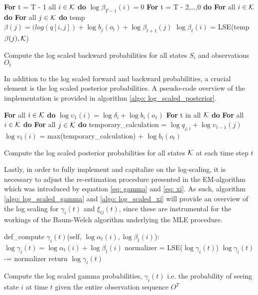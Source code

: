 \begin{algorithm}[H]
\textbf{For} t = T - 1 all $i \in \operatorname{\mathcal{K}}$ \textbf{do} \;
\Indp
$\log\beta_{T-1}(i) = 0$ \;
\BlankLine
\Indm
\textbf{For} t = T - 2,\ldots,0  \textbf{do} \;
\Indp
\textbf{For} all $i \in \operatorname{\mathcal{K}}$ \textbf{do} \;
\Indp 
\textbf{For} all $j \in \operatorname{\mathcal{K}}$ \textbf{do} \;
\Indp
temp $\beta(j) = (log(q[i, j]) + \log b_j(o_t) + \log\beta_{t+1}(j)$ \;
\BlankLine
\Indm
$\log\beta_{t}(i)$ = LSE(temp $\beta(j), \operatorname{\mathcal{K}}$) \;
\caption{Compute the log scaled backward probabilities for all states $S_i$ and observations $O_t$}
\label{algo: log_scaled_backward}
\end{algorithm}

In addition to the log scaled forward and backward probabilities, a crucial element is the log scaled posterior probabilities. A pseudo-code overview of the implementation is provided in algorithm \ref{algo: log_scaled_posterior}.

\begin{algorithm}[H]
\textbf{For} all $i \in \operatorname{\mathcal{K}}$ \textbf{do} \;
\Indp 
$\log \upsilon_1(i) = \log \delta_i + \log b_i(o_1)$ \;
\Indm
\textbf{For} t in all $\operatorname{\mathcal{K}}$ \textbf{do}  \;
\Indp
\textbf{For} all $i \in \operatorname{\mathcal{K}}$ \textbf{do} \;
\Indp
\textbf{For} all $j \in \operatorname{\mathcal{K}} $ \textbf{do} \;
\Indp
temporary\_calculation = $\log q_{j,i} + \log \upsilon_{t-1}(j)$ \;
\Indm
$\log \upsilon_t(i)$ = max(temporary\_calculation) + $\log b_i(o_t)$ \;
\BlankLine
\caption{Compute the log scaled posterior probabilities for all states $\operatorname{\mathcal{K}}$ at each time step $t$}
\label{algo: log_scaled_posterior}
\end{algorithm}

Lastly, in order to fully implement and capitalize on the log-scaling, it is necessary to adjust the re-estimation procedure presented in the EM-algorithm which was introduced by equation \ref{eq: gamma} and \ref{eq: xi}. As such, algorithm \ref{algo: log_scaled_gamma} and \ref{algo: log_scaled_xi} will provide an overview of the log scaling for $\gamma_i(t)$ and $\xi_{ij}(t)$, since these are instrumental for the workings of the Baum-Welch algorithm underlying the MLE procedure.

\begin{algorithm}[H]
def\_compute $\gamma_i(t)$(self, $\log\alpha_t(i), \log\beta_t(i)$): \;
\Indp 
$\log\gamma_i(t) = \log\alpha_t(i) + \log\beta_t(i)$ \;
normalizer = LSE($\log\gamma_i(t)$) \;
$\log\gamma_i(t)$ -= normalizer \;
\BlankLine
return $\log\gamma_i(t)$
\caption{Compute the log scaled gamma probabilities, $\gamma_i(t)$ i.e. the probability of seeing state $i$ at time $t$ given the entire observation sequence $O^T$}
\label{algo: log_scaled_gamma}
\end{algorithm}

